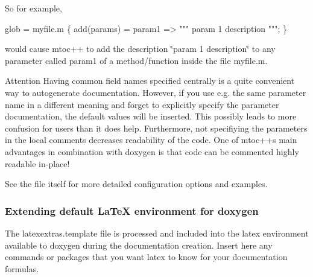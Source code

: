 So for example, 
\begin{DoxyCode}
glob = myfile.m \{ add(params) = param1 => \textcolor{stringliteral}{""}\textcolor{stringliteral}{" param 1 description "}\textcolor{stringliteral}{""}; \} 
\end{DoxyCode}
 would cause mtoc++ to add the description \char`\"{}param 1 description\char`\"{} to any parameter called {\ttfamily param1} of a method/function inside the file {\ttfamily myfile.\+m}.

\begin{DoxyAttention}{Attention}
Having common field names specified centrally is a quite convenient way to autogenerate documentation. However, if you use e.\+g. the same parameter name in a different meaning and forget to explicitly specify the parameter documentation, the default values will be inserted. This possibly leads to more confusion for users than it does help. Furthermore, not specifiying the parameters in the local comments decreases readability of the code. One of mtoc++\textquotesingle{}s main advantages in combination with doxygen is that code can be commented highly readable in-\/place!
\end{DoxyAttention}
See the file itself for more detailed configuration options and examples.\hypertarget{tools_config_latex}{}\subsubsection{Extending default La\+Te\+X environment for doxygen}\label{tools_config_latex}
The {\ttfamily latexextras.\+template} file is processed and included into the latex environment available to doxygen during the documentation creation. Insert here any commands or packages that you want latex to know for your documentation formulas.

